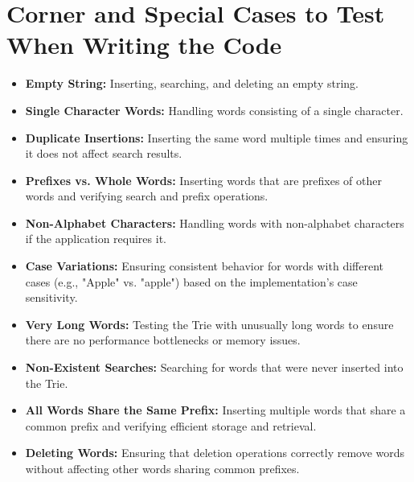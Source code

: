 \section*{Corner and Special Cases to Test When Writing the Code}

\begin{itemize}
    \item \textbf{Empty String:} Inserting, searching, and deleting an empty string.
    
    \item \textbf{Single Character Words:} Handling words consisting of a single character.
    
    \item \textbf{Duplicate Insertions:} Inserting the same word multiple times and ensuring it does not affect search results.
    
    \item \textbf{Prefixes vs. Whole Words:} Inserting words that are prefixes of other words and verifying search and prefix operations.
    
    \item \textbf{Non-Alphabet Characters:} Handling words with non-alphabet characters if the application requires it.
    
    \item \textbf{Case Variations:} Ensuring consistent behavior for words with different cases (e.g., "Apple" vs. "apple") based on the implementation's case sensitivity.
    
    \item \textbf{Very Long Words:} Testing the Trie with unusually long words to ensure there are no performance bottlenecks or memory issues.
    
    \item \textbf{Non-Existent Searches:} Searching for words that were never inserted into the Trie.
    
    \item \textbf{All Words Share the Same Prefix:} Inserting multiple words that share a common prefix and verifying efficient storage and retrieval.
    
    \item \textbf{Deleting Words:} Ensuring that deletion operations correctly remove words without affecting other words sharing common prefixes.
\end{itemize}

